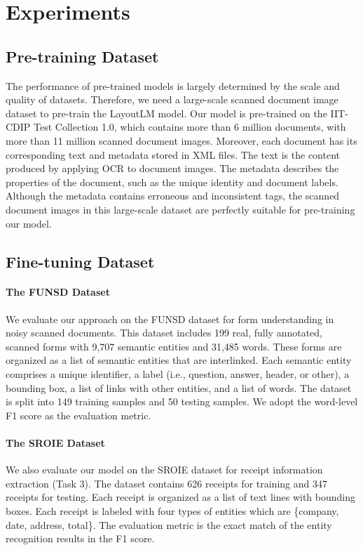 \documentclass[sigconf]{acmart}
\begin{document}
\section{Experiments}
\subsection{Pre-training Dataset}
The performance of pre-trained models is largely determined by the scale and quality of datasets. Therefore, we need a large-scale scanned document image dataset to pre-train the LayoutLM model. Our model is pre-trained on the IIT-CDIP Test Collection 1.0, which contains more than 6 million documents, with more than 11 million scanned document images. Moreover, each document has its corresponding text and metadata stored in XML files. The text is the content produced by applying OCR to document images. The metadata describes the properties of the document, such as the unique identity and document labels. Although the metadata contains erroneous and inconsistent tags, the scanned document images in this large-scale dataset are perfectly suitable for pre-training our model.

\subsection{Fine-tuning Dataset}

\paragraph{The FUNSD Dataset} 
We evaluate our approach on the FUNSD dataset for form understanding in noisy scanned documents. This dataset includes 199 real, fully annotated, scanned forms with 9,707 semantic entities and 31,485 words. These forms are organized as a list of semantic entities that are interlinked. Each semantic entity comprises a unique identifier, a label (i.e., question, answer, header, or other), a bounding box, a list of links with other entities, and a list of words. The dataset is split into 149 training samples and 50 testing samples. We adopt the word-level F1 score as the evaluation metric.

\paragraph{The SROIE Dataset}

We also evaluate our model on the SROIE dataset for receipt information extraction (Task 3). The dataset contains 626 receipts for training and 347 receipts for testing. Each receipt is organized as a list of text lines with bounding boxes. Each receipt is labeled with four types of entities which are \{company, date, address, total\}. The evaluation metric is the exact match of the entity recognition results in the F1 score.
\end{document}
